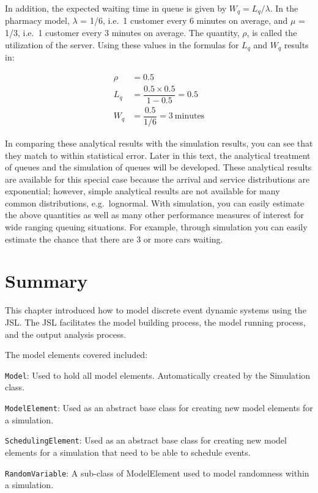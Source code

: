\documentclass[
]{book}
\theoremstyle{definition}
\theoremstyle{definition}
\theoremstyle{definition}
\theoremstyle{definition}
\theoremstyle{remark}
\begin{document}
In addition, the expected waiting time in queue is given by
\(W_q = L_q/\lambda\). In the pharmacy model, \(\lambda\) = 1/6, i.e.~1
customer every 6 minutes on average, and \(\mu\) = 1/3, i.e.~1 customer
every 3 minutes on average. The quantity, \(\rho\), is called the
utilization of the server. Using these values in the formulas for \(L_q\)
and \(W_q\) results in:

\[\begin{aligned}
\rho & = 0.5 \\
L_q  & = \dfrac{0.5 \times 0.5}{1 - 0.5} = 0.5  \\
W_q & = \dfrac{0.5}{1/6} = 3 \: \text{minutes}\end{aligned}\]

In comparing these analytical results with the simulation results, you
can see that they match to within statistical error. Later in this text,
the analytical treatment of queues and the simulation of queues will be
developed. These analytical results are available for this special case
because the arrival and service distributions are exponential; however,
simple analytical results are not available for many common
distributions, e.g.~lognormal. With simulation, you can easily estimate
the above quantities as well as many other performance measures of
interest for wide ranging queuing situations. For example, through
simulation you can easily estimate the chance that there are 3 or more
cars waiting.

\hypertarget{introDEDS:Summary}{%
\section{Summary}\label{introDEDS:Summary}}

This chapter introduced how to model discrete event dynamic systems
using the JSL. The JSL facilitates the model building process, the model
running process, and the output analysis process.

The model elements covered included:

\texttt{Model}: Used to hold all model elements. Automatically created by the
Simulation class.

\texttt{ModelElement}: Used as an abstract base class for creating new model elements for a
simulation.

\texttt{SchedulingElement}: Used as an abstract base class for creating new model elements for a simulation that need to be able to schedule events.

\texttt{RandomVariable}: A sub-class of ModelElement used to model randomness within a
simulation.
\end{document}
